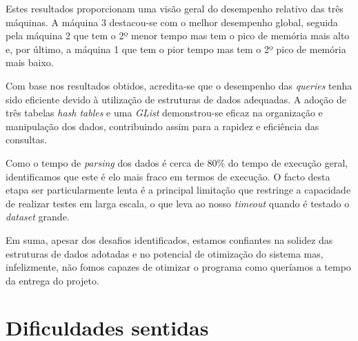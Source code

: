 \documentclass[12pt,a4paper]{report}
\begin{document}
    Estes resultados proporcionam uma visão geral do desempenho relativo das três máquinas. A máquina 3 destacou-se com o melhor desempenho global, seguida pela máquina 2 que tem o 2º menor tempo mas tem o pico de memória mais alto e, por último, a máquina 1 que tem o pior tempo mas tem o 2º pico de memória mais baixo.

    Com base nos resultados obtidos, acredita-se que o desempenho das \textit{queries} tenha sido eficiente devido à utilização de estruturas de dados adequadas. A adoção de três tabelas \textit{hash tables} e uma \textit{GList} demonstrou-se eficaz na organização e manipulação dos dados, contribuindo assim para a rapidez e eficiência das consultas.

    Como o tempo de \textit{parsing} dos dados é cerca de 80\% do tempo de execução geral, identificamos que este é elo mais fraco em termos de execução. O facto desta etapa ser particularmente lenta é a principal limitação que restringe a capacidade de realizar testes em larga escala, o que leva ao nosso \textit{timeout} quando é testado o \textit{dataset} grande.

    Em suma, apesar dos desafios identificados, estamos confiantes na solidez das estruturas de dados adotadas e no potencial de otimização do sistema mas, infelizmente, não fomos capazes de otimizar o programa como queríamos a tempo da entrega do projeto.  



    \chapter{Dificuldades sentidas}
\end{document}
